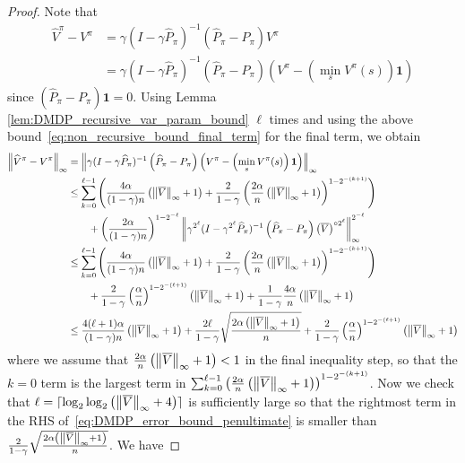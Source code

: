 \documentclass{article}
\theoremstyle{plain}
\theoremstyle{plain}
\theoremstyle{remark}
\theoremstyle{plain}
\theoremstyle{plain}
\newcommand{\Phat}{\widehat{P}}
\newcommand{\Vhat}{\widehat{V}}
\newcommand{\one}{\mathbf{1}}
\newcommand{\Vc}{\overline{V}}
\begin{document}
\begin{proof}
Note that
\begin{align*}
    \Vhat^\pi - V^\pi &= \gamma (I - \gamma \Phat_\pi)^{-1} \left(\Phat_\pi - P_\pi\right) V^\pi \\
    &= \gamma  (I - \gamma \Phat_\pi)^{-1} \left(\Phat_\pi - P_\pi\right) \left(V^\pi -  \left( \min_s V^\pi(s) \right) \one \right)
\end{align*}
since $\left(\Phat_\pi - P_\pi\right) \one = 0$.
Using Lemma \ref{lem:DMDP_recursive_var_param_bound} $\ell$ times and using the above bound~\eqref{eq:non_recursive_bound_final_term} for the final term, we obtain
\begin{align}
    \infnorm{ \Vhat^\pi - V^\pi} &= \infnorm{\gamma  (I - \gamma \Phat_\pi)^{-1} \left(\Phat_\pi - P_\pi\right) \left(V^\pi -  \left( \min_s V^\pi(s) \right) \one \right)} \nonumber\\
    & \leq \sum_{k = 0}^{\ell - 1} \left( \frac{4 \alpha}{(1-\gamma)n} \left( \infnorm{\Vc} + 1\right) + \frac{ 2 }{1-\gamma} \left(\frac{2\alpha }{n} \left( \infnorm{\Vc} + 1\right) \right)^{1-2^{-{(k+1)}}} \right) \nonumber \\
    & \quad \quad + \left(\frac{2\alpha}{(1-\gamma)n}\right)^{1-2^{-\ell}} \infnorm{\gamma^{2^{\ell}}(I - \gamma^{2^{\ell}} \Phat_{\pi})^{-1}\left(\Phat_\pi - P_\pi \right) \left(\Vc \right)^{\circ 2^{\ell}}}^{2^{-\ell}} \nonumber \\
    & \leq \sum_{k = 0}^{\ell - 1} \left( \frac{4 \alpha}{(1-\gamma)n} \left( \infnorm{\Vc} + 1\right) + \frac{ 2 }{1-\gamma} \left(\frac{2\alpha }{n} \left( \infnorm{\Vc} + 1\right) \right)^{1-2^{-{(k+1)}}} \right) \nonumber \\
    & \quad \quad + \frac{2}{1-\gamma} \left(\frac{\alpha}{n}\right)^{1-2^{-(\ell+1)}} \left( \infnorm{\Vc} + 1\right) + \frac{1}{1-\gamma}\frac{4 \alpha}{n} \left( \infnorm{\Vc} + 1\right)\nonumber  \\
    & \leq \frac{4 (\ell + 1) \alpha}{(1-\gamma)n} \left( \infnorm{\Vc} + 1\right) + \frac{2\ell}{1-\gamma} \sqrt{\frac{2 \alpha \left( \infnorm{\Vc} + 1\right)}{n}} + \frac{2}{1-\gamma} \left(\frac{\alpha}{n}\right)^{1-2^{-(\ell+1)}} \left( \infnorm{\Vc} + 1\right) \label{eq:DMDP_error_bound_penultimate}
\end{align}
where we assume that $\frac{2\alpha }{n} \left( \infnorm{\Vc} + 1\right)  < 1$ in the final inequality step, so that the $k=0$ term is the largest term in $\sum_{k = 0}^{\ell - 1}  \left(\frac{2\alpha }{n} \left( \infnorm{\Vc} + 1\right) \right)^{1-2^{-{(k+1)}}} $. Now we check that $\ell = \lceil\log_2 \log_2 \left( \infnorm{\Vc} + 4\right) \rceil$ is sufficiently large so that the rightmost term in the RHS of~\eqref{eq:DMDP_error_bound_penultimate} is smaller than $\frac{2}{1-\gamma} \sqrt{\frac{2\alpha \left( \infnorm{\Vc} + 1\right)}{n}}$. We have

\end{proof}
\end{document}
